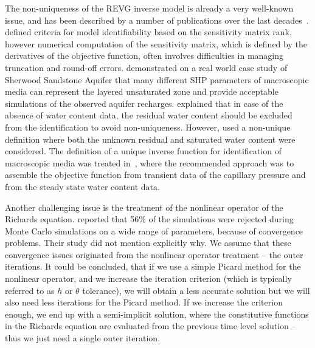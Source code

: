 \documentclass[review,times,3p,twocolumn,10pt]{elsarticle}
\begin{document}
The non-uniqueness of the REVG inverse model is already a very well-known issue, and has been described by a number of publications over the last decades~\citep{kool1985, mous1993, ihlwang2003, beven2003-uncertain,Kowalsky04,Nakhaei, Kamali,pena17}.%
\cite{mous1993} defined criteria for model identifiability based on the sensitivity matrix rank, however numerical computation of the sensitivity matrix, which is defined by the derivatives of the objective function, often involves difficulties in managing truncation and round-off errors.
\cite{beven2003-uncertain} demonstrated on a real world case study of Sherwood Sandstone Aquifer that many different SHP parameters of macroscopic media can represent the layered unsaturated zone and provide acceptable simulations of the observed aquifer recharges.  \cite{mous1993} explained that in case of the absence of water content data, the residual water content should be excluded from the identification to avoid non-uniqueness. However, \cite{beven2003-uncertain} used
a non-unique definition where both the unknown residual and saturated water content were considered.
The definition of a unique inverse function for identification of macroscopic media was treated in~\citep{zou200126}, where the recommended approach was to assemble the objective function from transient data of the capillary pressure and from the steady state water content data. %

Another challenging issue is the treatment of the nonlinear operator of the Richards equation. \cite{beven2003-uncertain} reported that 56\% of the simulations were rejected during Monte Carlo simulations on a wide range of parameters, because of convergence problems. 
Their study did not mention explicitly why. We assume that these convergence issues originated from the nonlinear operator treatment -- the outer iterations.
It could be concluded, that if we use a simple Picard method for the nonlinear operator, and we increase the iteration criterion (which is typically referred to as $h$ or $\theta$ tolerance), we will obtain a less accurate solution but we will also need less iterations for the Picard method. If we increase the criterion enough, we end up with a semi-implicit solution, where the constitutive functions in the Richards equation are evaluated from the previous time level solution -- thus we just need a single outer iteration.
\end{document}
